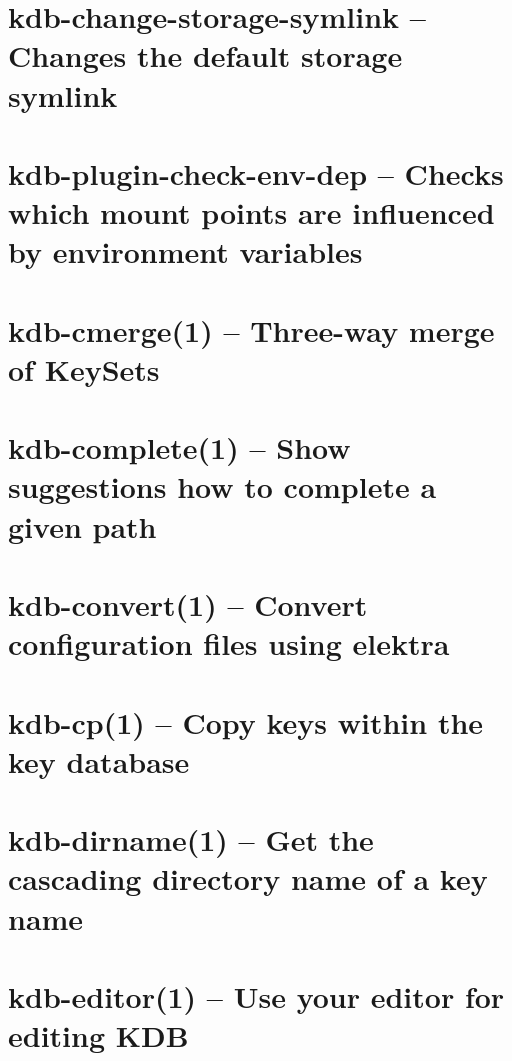 \let\mypdfximage\pdfximage\def\pdfximage{\immediate\mypdfximage}\documentclass[twoside]{book}
\newcommand{\+}{\discretionary{\mbox{\scriptsize$\hookleftarrow$}}{}{}}
\begin{document}
\chapter{kdb-\/change-\/storage-\/symlink -- Changes the default storage symlink}
\label{doc_help_kdb-change-storage-symlink_md}

\chapter{kdb-\/plugin-\/check-\/env-\/dep -- Checks which mount points are influenced by environment variables}
\label{doc_help_kdb-check-env-dep_md}

\chapter{kdb-\/cmerge(1) -- Three-\/way merge of Key\+Sets}
\label{doc_help_kdb-cmerge_md}

\chapter{kdb-\/complete(1) -- Show suggestions how to complete a given path}
\label{doc_help_kdb-complete_md}

\chapter{kdb-\/convert(1) -- Convert configuration files using elektra}
\label{doc_help_kdb-convert_md}

\chapter{kdb-\/cp(1) -- Copy keys within the key database}
\label{doc_help_kdb-cp_md}

\chapter{kdb-\/dirname(1) -- Get the cascading directory name of a key name}
\label{doc_help_kdb-dirname_md}

\chapter{kdb-\/editor(1) -- Use your editor for editing KDB}
\label{doc_help_kdb-editor_md}

\end{document}
